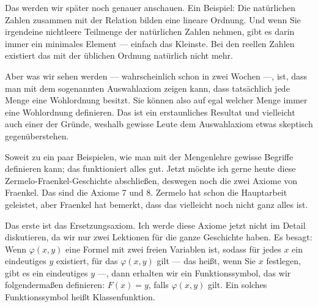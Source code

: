 \begin{math-stroke}[Wohlordnungen]

\end{math-stroke}

\begin{spoken-clean}[01:17:57 - 01:19:48]
Das werden wir später noch genauer anschauen. Ein Beispiel: Die natürlichen Zahlen zusammen mit der Relation  bilden eine lineare Ordnung. Und wenn Sie irgendeine nichtleere Teilmenge der natürlichen Zahlen nehmen, gibt es darin immer ein minimales Element --- einfach das Kleinste. Bei den reellen Zahlen existiert das mit der üblichen Ordnung natürlich nicht mehr.

Aber was wir sehen werden --- wahrscheinlich schon in zwei Wochen ---, ist, dass man mit dem sogenannten Auswahlaxiom zeigen kann, dass tatsächlich jede Menge eine Wohlordnung besitzt. Sie können also auf egal welcher Menge immer eine Wohlordnung definieren. Das ist ein erstaunliches Resultat und vielleicht auch einer der Gründe, weshalb gewisse Leute dem Auswahlaxiom etwas skeptisch gegenüberstehen.
\end{spoken-clean}

\begin{spoken-clean}[01:19:48 - 01:21:39]
Soweit zu ein paar Beispielen, wie man mit der Mengenlehre gewisse Begriffe definieren kann; das funktioniert alles gut. Jetzt möchte ich gerne heute diese Zermelo-Fraenkel-Geschichte abschließen, deswegen noch die zwei Axiome von Fraenkel. Das sind die Axiome 7 und 8. Zermelo hat schon die Hauptarbeit geleistet, aber Fraenkel hat bemerkt, dass das vielleicht noch nicht ganz alles ist.

Das erste ist das Ersetzungsaxiom. Ich werde diese Axiome jetzt nicht im Detail diskutieren, da wir nur zwei Lektionen für die ganze Geschichte haben. Es besagt: Wenn $\varphi(x, y)$ eine Formel mit zwei freien Variablen ist, sodass für jedes $x$ ein eindeutiges $y$ existiert, für das $\varphi(x, y)$ gilt --- das heißt, wenn Sie $x$ festlegen, gibt es ein eindeutiges $y$ ---, dann erhalten wir ein Funktionssymbol, das wir folgendermaßen definieren: $F(x) = y$, falls $\varphi(x, y)$ gilt. Ein solches Funktionssymbol heißt Klassenfunktion.
\end{spoken-clean}

